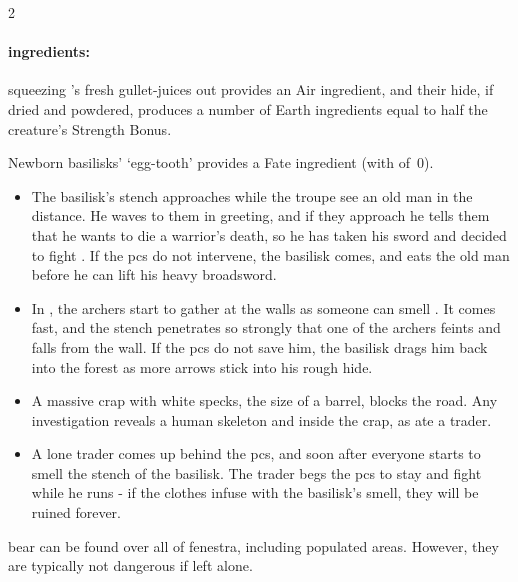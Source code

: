 \begin{multicols}{2}
\paragraph{\Glspl{ingredient}:}
squeezing 's fresh gullet-juices out provides an Air \gls{ingredient}, and their hide, if dried and powdered, produces a number of Earth \glspl{ingredient} equal to half the creature's Strength Bonus.

Newborn \glspl{basilisk}' `egg-tooth' provides a Fate \gls{ingredient} (with  of~0).

\showEnc

\begin{itemize}
  \item{The \gls{basilisk}'s stench approaches while the troupe see an old man in the distance.
  He waves to them in greeting, and if they approach he tells them that he wants to die a warrior's death, so he has taken his sword and decided to fight .
  If the \glspl{pc} do not intervene, the \gls{basilisk} comes, and eats the old man before he can lift his heavy broadsword.}
  \item
  In , the archers start to gather at the walls as someone can smell .
  It comes fast, and the stench penetrates so strongly that one of the archers feints and falls from the wall.
  If the \glspl{pc} do not save him, the \gls{basilisk} drags him back into the forest as more arrows stick into his rough hide.
  \item
  A massive crap with white specks, the size of a barrel, blocks the road.
  Any investigation reveals a human skeleton and  inside the crap, as  ate a trader.
  \item
  A lone trader comes up behind the \glspl{pc}, and soon after everyone starts to smell the stench of the \gls{basilisk}.
  The trader begs the \glspl{pc} to stay and fight while he runs - if the clothes infuse with the \gls{basilisk}'s smell, they will be ruined forever.
\end{itemize}

  {bear}%
can be found over all of \gls{fenestra}, including populated areas.
However, they are typically not dangerous if left alone.

\bear


\end{multicols}
